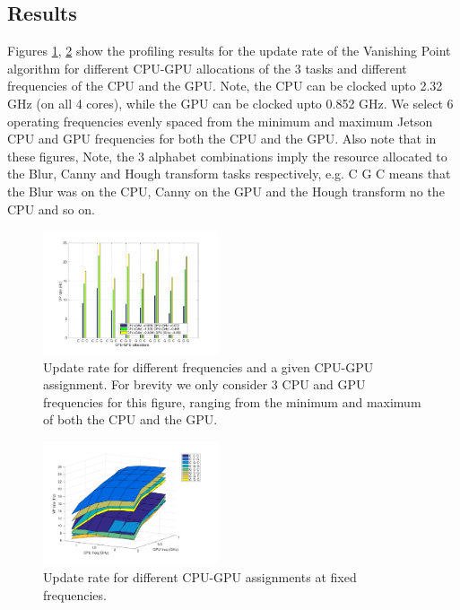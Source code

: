 \subsection{Results}

Figures \ref{fig:dfsa}, \ref{fig:sfda} show the profiling results for the update rate of the Vanishing Point algorithm for different CPU-GPU allocations of the 3 tasks and different frequencies of the CPU and the GPU. Note, the CPU can be clocked upto 2.32 GHz (on all 4 cores), while the GPU can be clocked upto 0.852 GHz. We select 6 operating frequencies evenly spaced from the minimum and maximum Jetson CPU and GPU frequencies for both the CPU and the GPU. Also note that in these figures, Note, the 3 alphabet combinations imply the resource allocated to the Blur, Canny and Hough transform tasks respectively, e.g. C G C means that the Blur was on the CPU, Canny on the GPU and the Hough transform no the CPU and so on.


\begin{figure}[hbtp]
\centering
\includegraphics[width=0.46\textwidth]{Data/figs/RateHist.pdf}
\caption{Update rate for different frequencies and a given CPU-GPU assignment. For brevity we only consider 3 CPU and GPU frequencies for this figure, ranging from the minimum and maximum of both the CPU and the GPU. }
\label{fig:dfsa} %
\end{figure}

\begin{figure}[htbp]
	\centering
	\includegraphics[width=0.46\textwidth]{Data/figs/surf_Rate.pdf}
	\caption{Update rate for different CPU-GPU assignments at fixed frequencies.}
	\label{fig:sfda}%
\end{figure}

